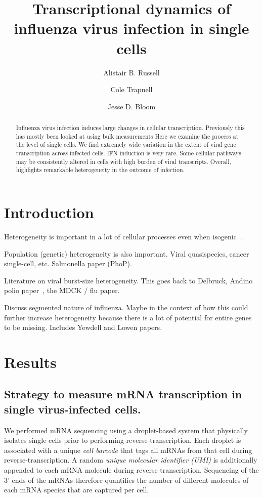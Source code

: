 \documentclass[9pt,lineno]{elife}
\title{Transcriptional dynamics of influenza virus infection in single cells}
\author[1]{Alistair B. Russell}
\author[2]{Cole Trapnell}
\author[1,2*]{Jesse D. Bloom}
\affil[1]{Basic Sciences Division and Computational Biology Program, Fred Hutchinson Cancer Research Center, Seattle, United States}
\affil[2]{Department of Genome Sciences, University of Washington, Seattle, United States}
\begin{document}
\maketitle

\begin{abstract}
Influenza virus infection induces large changes in cellular transcription.
Previously this has mostly been looked at using bulk measurements
Here we examine the process at the level of single cells.
We find extremely wide variation in the extent of viral gene transcription across infected cells.
IFN induction is very rare.
Some cellular pathways may be consistently altered in cells with high burden of viral transcripts.
Overall, highlights remarkable heterogeneity in the outcome of infection.
\end{abstract}


\section{Introduction}

Heterogeneity is important in a lot of cellular processes even when isogenic~\citep{shalek2013single,shalek2014single}.

Population (genetic) heterogeneity is also important. 
Viral quasispecies, cancer single-cell, etc.
Salmonella paper (PhoP).

Literature on viral burst-size heterogeneity.
This goes back to Delbruck, Andino polio paper~\citep{schulte2014single}, the MDCK / flu paper.

Discuss segmented nature of influenza.
Maybe in the context of how this could further increase heterogeneity because there is a lot of potential for entire genes to be missing.
Includes Yewdell and Lowen papers.

\section{Results}

\subsection{Strategy to measure mRNA transcription in single virus-infected cells.}
We performed mRNA sequencing using a droplet-based system that physically isolates single cells prior to performing reverse-transcription.
Each droplet is associated with a unique \emph{cell barcode} that tags all mRNAs from that cell during reverse-transcription.
A random \emph{unique molecular identifier (UMI)} is additionally appended to each mRNA molecule during reverse transcription.
Sequencing of the 3' ends of the mRNAs therefore quantifies the number of different molecules of each mRNA species that are captured per cell.
\end{document}
